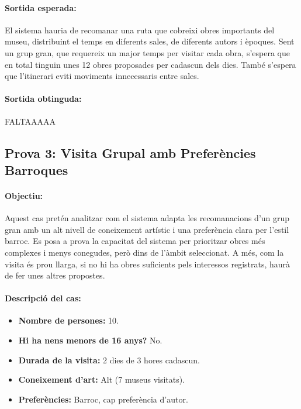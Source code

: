 \documentclass[a4paper]{article}
\begin{document}
	\paragraph{Sortida esperada:}
	El sistema hauria de recomanar una ruta que cobreixi obres importants del museu, distribuint el temps en diferents sales, de diferents autors i èpoques. Sent un grup gran, que requereix un major temps per visitar cada obra, s'espera que en total tinguin unes 12 obres proposades per cadascun dels dies. També s’espera que l’itinerari eviti moviments innecessaris entre sales.
	
	\paragraph{Sortida obtinguda:} FALTAAAAA
	
	
	\subsection{Prova 3: Visita Grupal amb Preferències Barroques}
	
	\paragraph{Objectiu:} 
	Aquest cas pretén analitzar com el sistema adapta les recomanacions d'un grup gran amb un alt nivell de coneixement artístic i una preferència clara per l’estil barroc. Es posa a prova la capacitat del sistema per prioritzar obres més complexes i menys conegudes, però dins de l’àmbit seleccionat. A més, com la visita és prou llarga, si no hi ha obres suficients pels interessos registrats, haurà de fer unes altres propostes.
	
	\paragraph{Descripció del cas:} 
	
	\begin{itemize}
		\item \textbf{Nombre de persones:} 10.
		\item \textbf{Hi ha nens menors de 16 anys?} No.
		\item \textbf{Durada de la visita:} 2 dies de 3 hores cadascun.
		\item \textbf{Coneixement d’art:} Alt (7 museus visitats).
		\item \textbf{Preferències:} Barroc, cap preferència d'autor.
	\end{itemize}
	
\end{document}
